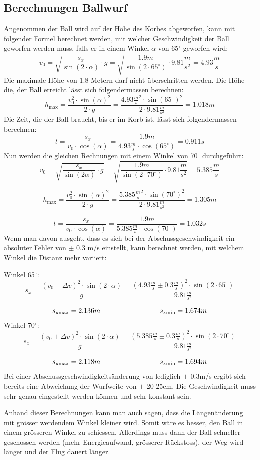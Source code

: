 \subsection{Berechnungen Ballwurf}
Angenommen der Ball wird auf der Höhe des Korbes abgeworfen, kann mit 
folgender Formel berechnet werden, mit welcher Geschwindigkeit der Ball 
geworfen werden muss, falls er in einem Winkel $\alpha$ von 65$^\circ$ 
geworfen wird:
%
\[ v_0 
    = \sqrt{ \frac{s_x}{\sin(2 \cdot \alpha)} \cdot g } 
    = \sqrt{ \frac{1.9m}{\sin(2 \cdot 65^\circ)} \cdot 9.81 \frac{m}{s^2}} 
    = 4.93 \frac{m}{s} \]
%
Die maximale Höhe von 1.8 Metern darf nicht überschritten werden. Die Höhe 
die, der Ball erreicht lässt sich folgendermassen berechnen:
%
\[ h_\text{max} 
    = \frac{v_0^2 \cdot \sin(\alpha)^2}{2 \cdot g} 
    = \frac{4.93 \frac{m}{s}^2 \cdot \sin(65^\circ)^2}{2 \cdot 9.81 \frac{m}{s^2}} 
    = 1.018m \]
%
Die Zeit, die der Ball braucht, bis er im Korb ist, lässt sich folgendermassen 
berechnen:
%
\[ t = \frac{s_x}{v_0 \cdot \cos(\alpha)} 
    = \frac{1.9m}{4.93 \frac{m}{s} \cdot \cos(65^\circ)} = 0.911s \]
%
Nun werden die gleichen Rechnungen mit einem Winkel von 70$^\circ$ durchgeführt:
%
\[ v_0 = \sqrt{ \frac{s_x}{\sin(2\alpha)} \cdot g } 
    = \sqrt{ \frac{1.9m}{\sin(2 \cdot 70^\circ)} \cdot 9.81 \frac{m}{s^2}} 
    = 5.385 \frac{m}{s} \]

\[ h_\text{max} = \frac{v_0^2 \cdot \sin(\alpha)^2}{2 \cdot g} 
    = \frac{5.385 \frac{m}{s}^2 \cdot \sin(70^\circ)^2}{2 \cdot 9.81 \frac{m}{s^2}} 
    = 1.305m \]

\[ t = \frac{s_x}{v_0 \cdot \cos(\alpha)} 
    = \frac{1.9m}{5.385 \frac{m}{s} \cdot \cos(70^\circ)} = 1.032s \]
%
Wenn man davon ausgeht, dass es sich bei der Abschussgeschwindigkeit ein 
absoluter Fehler von $\pm$ 0.3 m/s einstellt, kann berechnet werden, mit 
welchem Winkel die Distanz mehr variiert:

\noindent
Winkel 65$^\circ$:
%
\[ s_x = \frac{(v_0 \pm \Delta v)^2 \cdot \sin(2 \cdot \alpha)}{g} 
    = \frac{(4.93 \frac{m}{s} \pm 0.3 \frac{m}{s})^2 \cdot \sin(2 \cdot 65^\circ)}{9.81 \frac{m}{s^2}} \]

\[ s_\text{xmax} = 2.136m \hspace{30mm} s_\text{xmin} = 1.674m \]
%
Winkel 70$^\circ$:
%
\[ s_x = \frac{(v_0 \pm \Delta v)^2 \cdot \sin(2 \cdot \alpha)}{g} 
    = \frac{(5.385 \frac{m}{s} \pm 0.3 \frac{m}{s})^2 \cdot \sin(2 \cdot 70^\circ)}{9.81 \frac{m}{s^2}} \]

\[ s_\text{xmax} = 2.118m \hspace{30mm} s_\text{xmin} = 1.694m \]
%
Bei einer Abschussgeschwindigkeitsänderung von lediglich $\pm$ 0.3m/s ergibt 
sich bereits eine Abweichung der Wurfweite von $\pm$ 20-25cm. Die 
Geschwindigkeit muss sehr genau eingestellt werden können und sehr konstant sein.

\noindent
Anhand dieser Berechnungen kann man auch sagen, dass die Längenänderung mit 
grösser werdendem Winkel kleiner wird. Somit wäre es besser, den Ball in einem 
grösseren Winkel zu schiessen. Allerdings muss dann der Ball schneller 
geschossen werden (mehr Energieaufwand, grösserer Rückstoss), der Weg wird 
länger und der Flug dauert länger.
